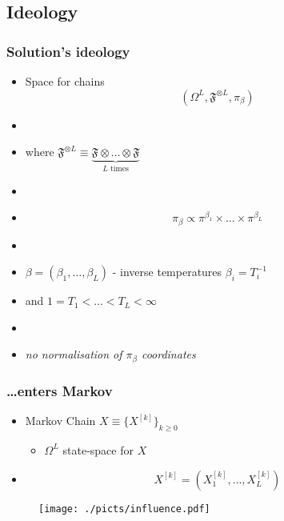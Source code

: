 		\subsection{Ideology}

\begin{frame}
		\frametitle{Solution's ideology}
	
	\begin{itemize}
			
		\item[] Space for chains
			 $$(\Omega^L, \mathfrak{F}^{\otimes L}, \pi_\beta)$$
		\item[]
		\item[] where $\mathfrak{F}^{\otimes L} \equiv \underbrace{\mathfrak{F} \otimes \dots \otimes \mathfrak{F}}_{\text{$L$ times}}$
		\item[]
		\item[] $$ \pi_\beta \propto \pi^{\beta_1} \times \dots \times \pi^{\beta_L} $$
		\item[]
		\item[] $\beta = (\beta_1 , \dots , \beta_L)$ - inverse temperatures $\beta_i = T_i^{-1}$
		\item[] and $1 = T_1 < \dots < T_L < \infty$	
		\item[]
		\item[]\emph{no normalisation of $\pi_\beta$ coordinates }	
	\end{itemize}	


\end{frame}


\begin{frame}
		\frametitle{\dots enters Markov}
	
	\begin{itemize}
			
		\item[] Markov Chain $X \equiv \{ X^{[k]}\}_{k \geq 0}$
		\begin{itemize}
			\item $\Omega^L$ state-space for $ X $
		\end{itemize}
		
		\item[]   $$X^{[k]} = (X_1^{[k]}, \dots, X_L^{[k]})$$
	\end{itemize}	

	\begin{center}
\begin{figure}\texttt{[image: ./picts/influence.pdf]}\end{figure}	
	\end{center}
\end{frame}


